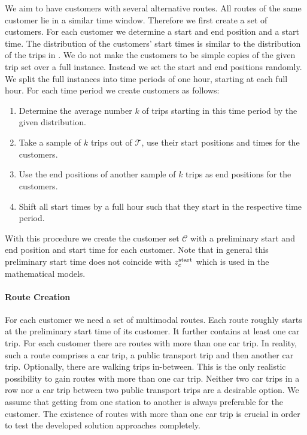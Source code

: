 We aim to have customers with several alternative routes. All routes of the same customer lie in a similar time window. Therefore we first create a set of customers. For each customer we determine a start and end position and a start time. The distribution of the customers' start times is similar to the distribution of the trips in . We do not make the customers to be simple copies of the given trip set over a full instance. Instead we set the start and end positions randomly. We split the full instances into time periods of one hour, starting at each full hour. For each time period we create customers as follows:
\begin{enumerate}
	\item Determine the average number $k$ of trips starting in this time period by the given distribution.
	\item Take a sample of $k$ trips out of $\widehat{\mathcal{T}}$, use their start positions and times for the customers.
	\item Use the end positions of another sample of $k$ trips as end positions for the customers.
	\item Shift all start times by a full hour such that they start in the respective time period.
\end{enumerate}

With this procedure we create the customer set $\mathcal{C}$ with a preliminary start and end position and start time for each customer. Note that in general this preliminary start time does not coincide with $z^{\operatorname{start}}_c$ which is used in the mathematical models.

\paragraph{Route Creation} \parfill

For each customer we need a set of multimodal routes. Each route roughly starts at the preliminary start time of its customer. It further contains at least one car trip. For each customer there are routes with more than one car trip. In reality, such a route comprises a car trip, a public transport trip and then another car trip. Optionally, there are walking trips in-between. This is the only realistic possibility to gain routes with more than one car trip. Neither two car trips in a row nor a car trip between two public transport trips are a desirable option. We assume that getting from one station to another is always preferable for the customer. The existence of routes with more than one car trip is crucial in order to test the developed solution approaches completely.

